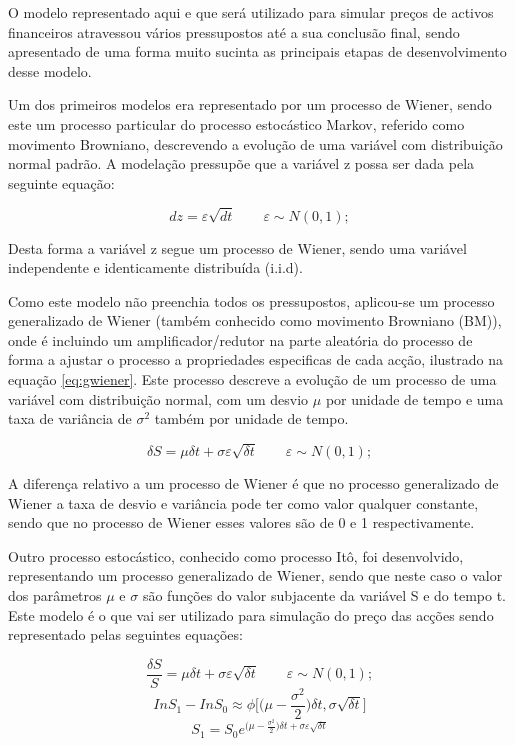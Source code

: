 \documentclass[
  12pt,
  a4paper,
  openany]{book}
\begin{document}
O modelo representado aqui e que será utilizado para simular preços de activos financeiros atravessou vários pressupostos até a sua conclusão final, sendo apresentado de uma forma muito sucinta as principais etapas de desenvolvimento desse modelo.

Um dos primeiros modelos era representado por um processo de Wiener, sendo este um processo particular do processo estocástico Markov, referido como movimento Browniano, descrevendo a evolução de uma variável com distribuição normal padrão. A modelação pressupõe que a variável z possa ser dada pela seguinte equação:

\begin{equation} 
  dz = \varepsilon \sqrt{dt}\qquad   \varepsilon \sim N(0,1);
  \label{eq:wiener}
\end{equation}

Desta forma a variável z segue um processo de Wiener, sendo uma variável independente e identicamente distribuída (i.i.d).

Como este modelo não preenchia todos os pressupostos, aplicou-se um processo generalizado de Wiener (também conhecido como movimento Browniano (BM)), onde é incluindo um amplificador/redutor na parte aleatória do processo de forma a ajustar o processo a propriedades especificas de cada acção, ilustrado na equação \eqref{eq:gwiener}. Este processo descreve a evolução de um processo de uma variável com distribuição normal, com um desvio \(\mu\) por unidade de tempo e uma taxa de variância de \(\sigma^2\) também por unidade de tempo.

\begin{equation} 
  \delta S = \mu\delta t +\sigma\varepsilon\sqrt{\delta t}\qquad\varepsilon \sim N(0,1);
  \label{eq:gwiener}
\end{equation}

A diferença relativo a um processo de Wiener é que no processo generalizado de Wiener a taxa de desvio e variância pode ter como valor qualquer constante, sendo que no processo de Wiener esses valores são de 0 e 1 respectivamente.

Outro processo estocástico, conhecido como processo Itô, foi desenvolvido, representando um processo generalizado de Wiener, sendo que neste caso o valor dos parâmetros \(\mu\) e \(\sigma\) são funções do valor subjacente da variável S e do tempo t. Este modelo é o que vai ser utilizado para simulação do preço das acções sendo representado pelas seguintes equações:

\begin{equation} 
  \frac{\delta S}{S} = \mu\delta t +\sigma\varepsilon\sqrt{\delta t}\qquad\varepsilon \sim N(0,1);
  \label{eq:ito}
\end{equation}
\begin{equation} 
  In S_1 - InS_0 \approx\phi\Big[\Big(\mu-\frac{\sigma^2}{2}\Big)\delta t, \sigma\sqrt{\delta t}\Big]
  \label{eq:Inito}
\end{equation}
\begin{equation} 
  S_1 =S_0 e^{\Big(\mu-\frac{\sigma^2}{2}\Big)\delta t + \sigma\varepsilon\sqrt{\delta t}}
  \label{eq:logprice}
\end{equation}
\end{document}
